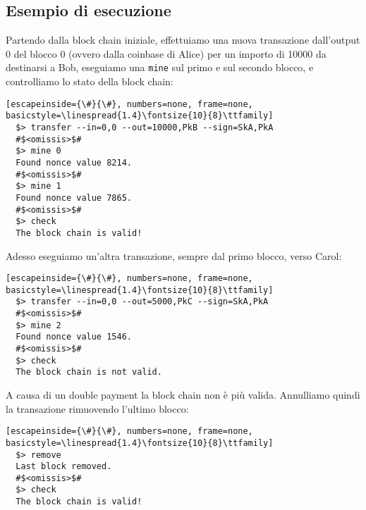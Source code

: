 \subsection*{Esempio di esecuzione} Partendo dalla block chain iniziale,
effettuiamo una nuova transazione dall'output 0 del blocco 0 (ovvero dalla
coinbase di Alice) per un importo di 10000 da destinarsi a Bob, eseguiamo una
{\tt mine} sul primo e sul secondo blocco, e controlliamo lo stato della block
chain:
%
\begin{lstlisting}[escapeinside={\#}{\#}, numbers=none, frame=none,
basicstyle=\linespread{1.4}\fontsize{10}{8}\ttfamily]
  $> transfer --in=0,0 --out=10000,PkB --sign=SkA,PkA
  #$<omissis>$#
  $> mine 0
  Found nonce value 8214.
  #$<omissis>$#
  $> mine 1
  Found nonce value 7865.
  #$<omissis>$#
  $> check
  The block chain is valid!
\end{lstlisting}
%
Adesso eseguiamo un'altra transazione, sempre dal primo blocco, verso Carol:
%
\begin{lstlisting}[escapeinside={\#}{\#}, numbers=none, frame=none,
basicstyle=\linespread{1.4}\fontsize{10}{8}\ttfamily]
  $> transfer --in=0,0 --out=5000,PkC --sign=SkA,PkA
  #$<omissis>$#
  $> mine 2
  Found nonce value 1546.
  #$<omissis>$#
  $> check
  The block chain is not valid.
\end{lstlisting}
%
A causa di un double payment la block chain non è più valida. Annulliamo quindi
la transazione rimuovendo l'ultimo blocco:
%
\begin{lstlisting}[escapeinside={\#}{\#}, numbers=none, frame=none,
basicstyle=\linespread{1.4}\fontsize{10}{8}\ttfamily]
  $> remove
  Last block removed.
  #$<omissis>$#
  $> check
  The block chain is valid!
\end{lstlisting}
